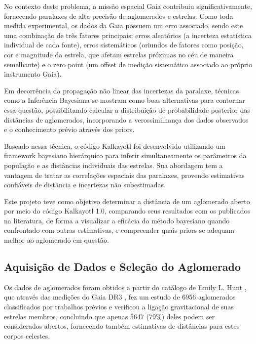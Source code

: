 \documentclass[12pt]{projeto}
\begin{document}
No contexto deste problema, a missão espacial Gaia \cite{gaia_collaboration_gaia_2016} contribuiu significativamente, fornecendo paralaxes de alta precisão de aglomerados e estrelas. Como toda medida experimental, os dados da Gaia possuem um erro associado, sendo este uma combinação de três fatores principais: erros aleatórios (a incerteza estatística individual de cada fonte), erros sistemáticos (oriundos de fatores como posição, cor e magnitude da estrela, que afetam estrelas próximas no céu de maneira semelhante) e o zero point (um offset de medição sistemático associado ao próprio instrumento Gaia).

Em decorrência da propagação não linear das incertezas da paralaxe, técnicas como a Inferência Bayesiana se mostram como boas alternativas para contornar essa questão, possibilitando calcular a distribuição de probabilidade posterior das distâncias de aglomerados, incorporando a verossimilhança dos dados observados e o conhecimento prévio através dos priors.

Baseado nessa técnica, o código Kalkayotl \cite{olivares_kalkayotl_2020} foi desenvolvido utilizando um framework bayesiano hierárquico para inferir simultaneamente os parâmetros da população e as distâncias individuais das estrelas. Sua abordagem tem a vantagem de tratar as correlações espaciais das paralaxes, provendo estimativas confiáveis de distância e incertezas não subestimadas. 

Este projeto teve como objetivo determinar a distância de um aglomerado aberto por meio do código Kalkayotl 1.0, comparando seus resultados com os publicados na literatura, de forma a visualizar a eficácia do método bayesiano quando confrontado com outras estimativas, e compreender quais priors se adequam melhor ao aglomerado em questão. 

\subsection{Aquisição de Dados e Seleção do Aglomerado}

Os dados de aglomerados foram obtidos a partir do catálogo de Emily L. Hunt \cite{hunt_improving_2024}, que através das medições do Gaia DR3 \cite{vallenari_gaia_2023}, fez um estudo de 6956 aglomerados classificados por trabalhos prévios e verificou a ligação gravitacional de suas estrelas membros, concluindo que apenas 5647 (79\%) deles podem ser considerados abertos, fornecendo também estimativas de distâncias para estes corpos celestes. 
\end{document}
